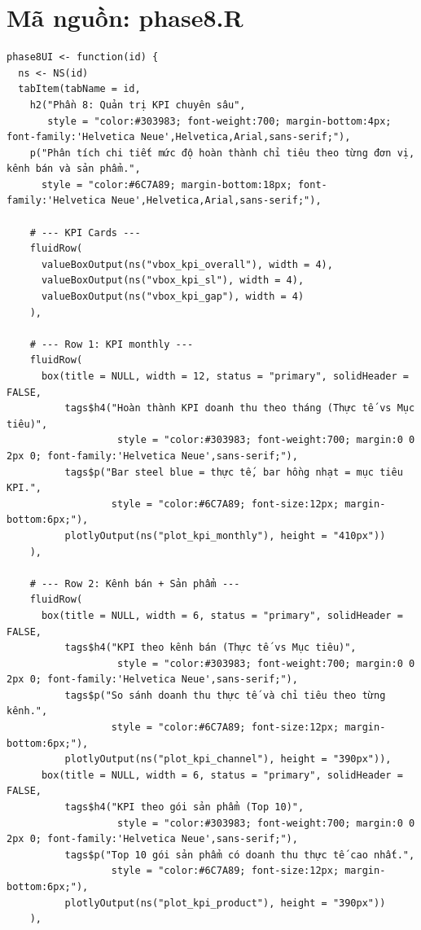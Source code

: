 \documentclass[12pt, a4paper]{article}
\begin{document}
\section{Mã nguồn: phase8.R}
\begin{lstlisting}
phase8UI <- function(id) {
  ns <- NS(id)
  tabItem(tabName = id,
    h2("Phần 8: Quản trị KPI chuyên sâu",
       style = "color:#303983; font-weight:700; margin-bottom:4px; font-family:'Helvetica Neue',Helvetica,Arial,sans-serif;"),
    p("Phân tích chi tiết mức độ hoàn thành chỉ tiêu theo từng đơn vị, kênh bán và sản phẩm.",
      style = "color:#6C7A89; margin-bottom:18px; font-family:'Helvetica Neue',Helvetica,Arial,sans-serif;"),

    # --- KPI Cards ---
    fluidRow(
      valueBoxOutput(ns("vbox_kpi_overall"), width = 4),
      valueBoxOutput(ns("vbox_kpi_sl"), width = 4),
      valueBoxOutput(ns("vbox_kpi_gap"), width = 4)
    ),

    # --- Row 1: KPI monthly ---
    fluidRow(
      box(title = NULL, width = 12, status = "primary", solidHeader = FALSE,
          tags$h4("Hoàn thành KPI doanh thu theo tháng (Thực tế vs Mục tiêu)",
                   style = "color:#303983; font-weight:700; margin:0 0 2px 0; font-family:'Helvetica Neue',sans-serif;"),
          tags$p("Bar steel blue = thực tế, bar hồng nhạt = mục tiêu KPI.",
                  style = "color:#6C7A89; font-size:12px; margin-bottom:6px;"),
          plotlyOutput(ns("plot_kpi_monthly"), height = "410px"))
    ),

    # --- Row 2: Kênh bán + Sản phẩm ---
    fluidRow(
      box(title = NULL, width = 6, status = "primary", solidHeader = FALSE,
          tags$h4("KPI theo kênh bán (Thực tế vs Mục tiêu)",
                   style = "color:#303983; font-weight:700; margin:0 0 2px 0; font-family:'Helvetica Neue',sans-serif;"),
          tags$p("So sánh doanh thu thực tế và chỉ tiêu theo từng kênh.",
                  style = "color:#6C7A89; font-size:12px; margin-bottom:6px;"),
          plotlyOutput(ns("plot_kpi_channel"), height = "390px")),
      box(title = NULL, width = 6, status = "primary", solidHeader = FALSE,
          tags$h4("KPI theo gói sản phẩm (Top 10)",
                   style = "color:#303983; font-weight:700; margin:0 0 2px 0; font-family:'Helvetica Neue',sans-serif;"),
          tags$p("Top 10 gói sản phẩm có doanh thu thực tế cao nhất.",
                  style = "color:#6C7A89; font-size:12px; margin-bottom:6px;"),
          plotlyOutput(ns("plot_kpi_product"), height = "390px"))
    ),


\end{lstlisting}
\end{document}
